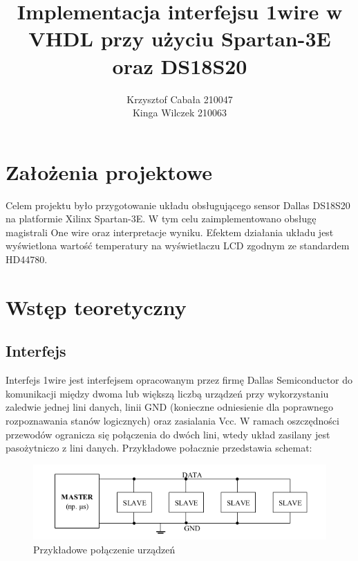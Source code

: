 \documentclass[a4paper]{article}
\title{\vspace{80mm}Implementacja interfejsu 1wire w VHDL przy użyciu Spartan-3E oraz DS18S20}
\author{Krzysztof Cabała 210047\\ Kinga Wilczek 210063\vspace{110mm}}
\begin{document}
\maketitle
\thispagestyle{empty}

\tableofcontents
\newpage
{}
\listoffigures

\newpage

\section{Założenia projektowe}

Celem projektu było przygotowanie układu obsługującego sensor Dallas DS18S20 na platformie Xilinx Spartan-3E. W tym celu zaimplementowano obsługę magistrali One wire oraz interpretacje wyniku. Efektem działania układu jest wyświetlona wartość temperatury na wyświetlaczu LCD zgodnym ze standardem HD44780.

\section{Wstęp teoretyczny}
\subsection{Interfejs}
Interfejs 1wire jest interfejsem opracowanym przez firmę Dallas Semiconductor \cite{bib_kom} do komunikacji między dwoma lub większą liczbą urządzeń przy wykorzystaniu zaledwie jednej lini danych, linii GND (konieczne odniesienie dla poprawnego rozpoznawania stanów logicznych) oraz zasialania Vcc. 
W ramach oszczędności przewodów ogranicza się połączenia do dwóch lini, wtedy układ zasilany jest pasożytniczo z lini danych.
Przykładowe połacznie przedstawia schemat:

\begin{figure}[h]
\begin{center}
\includegraphics[scale=0.3]{graphics/idea.png}
\end{center}
\caption{Przykładowe połączenie urządzeń}
\label{schemonewire}
\end{figure}
\end{document}
